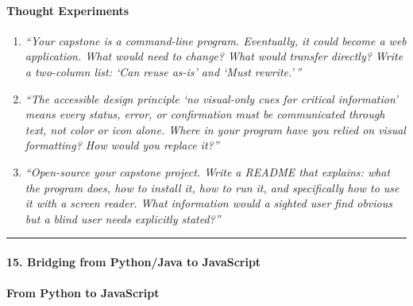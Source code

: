 \documentclass[
  justified,
  openright,
]{tufte-book}
\let\subsection\paragraph
\let\paragraph\paragraph
\let\subsection\paragraph
\let\paragraph\paragraph
\begin{document}
\paragraph{Thought Experiments}\label{thought-experiments-29}

\begin{enumerate}
\def\labelenumi{\arabic{enumi}.}
\item
  \emph{``Your capstone is a command-line program. Eventually, it could
  become a web application. What would need to change? What would
  transfer directly? Write a two-column list: `Can reuse as-is' and
  `Must rewrite.'\,''}
\item
  \emph{``The accessible design principle `no visual-only cues for
  critical information' means every status, error, or confirmation must
  be communicated through text, not color or icon alone. Where in your
  program have you relied on visual formatting? How would you replace
  it?''}
\item
  \emph{``Open-source your capstone project. Write a README that
  explains: what the program does, how to install it, how to run it, and
  specifically how to use it with a screen reader. What information
  would a sighted user find obvious but a blind user needs explicitly
  stated?''}
\end{enumerate}

\begin{center}\rule{0.5\linewidth}{0.5pt}\end{center}

\subsection{15. Bridging from Python/Java to
JavaScript}\label{bridging-from-pythonjava-to-javascript}

\subsection{From Python to
JavaScript}\label{from-python-to-javascript}
\end{document}
